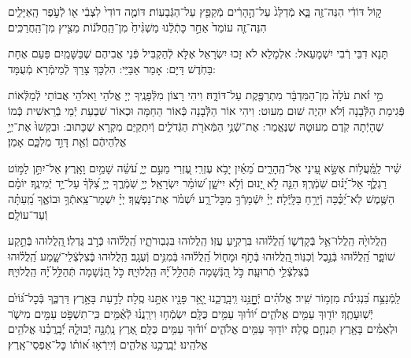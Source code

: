 \documentclass[twoside, openany, parskip=half, 11pt]{book}
\begin{document}
ק֣וֹל דּוֹדִ֔י הִנֵּה־זֶ֖ה בָּ֑א מְֿדַלֵּג֙ עַל־הֶ֣הָרִ֔ים מְֿקַפֵּ֖ץ עַל־הַגְּֿבָעֽוֹת׃ דּוֹמֶ֤ה דוֹדִי֙ לִצְבִ֔י א֖וֹ לְֿעֹ֣פֶר הָֽאַיָּלִ֑ים הִנֵּה־זֶ֤ה עוֹמֵד֙ אַחַ֣ר כָּתְֿלֵ֔נוּ מַשְׁגִּ֨יחַ֙ מִן־הַֽחֲלֹּנ֔וֹת מֵצִ֖יץ מִן־הַֽחֲרַכִּֽים׃

תָּנָא דִבֵּי רְֿבִי יִשְׁמָעֵאל: אִלְמָלֵא לֹא זָכוּ יִשְׂרָאֵל אֶלָּא לְֿהַקְבִּיל פְּֿנֵי אֲבִיהֶם שֶׁבַּשָּׁמַֽיִם פַּעַם אֶחָת בַּחֹֽדֶשׁ דַּיָּם: אָמַר אַבַּיֵּי: הִלְכָּךְ צָרֵךְ לְֿמֵימְֿרָא מְֿעֻמָּד:

מִ֣י זֹ֗את עֹלָה֙ מִן־הַמִּדְבָּ֔ר מִתְרַפֶּ֖קֶת עַל־דּוֹדָ֑הּ׃
וִיהִי רָצוֹן מִלְּֿפָנֶֽיךָ יְיָ אֱלֹהַי וֵאלֹהֵי אֲבוֹתַי לְֿמַלְּֿאוֹת פְּֿגִימַת הַלְּֿבָנָה וְֿלֹא יִהְיֶה שׁוּם מִעוּט: וִיהִי אוֹר הַלְּֿבָנָה כְּֿאוֹר הַחַמָּה וּכְאוֹר שִׁבְעַת יְֿמֵי בְֿרֵאשִׁית כְּֿמוֹ שֶׁהָיְֿתָה קֹֽדֶם מִעוּטָהּ שֶׁנֶּאֱמַר:
אֶת־שְֿׁנֵ֥י הַמְּֿאֹרֹ֖ת הַגְּֿדֹלִ֑ים וְֿיִתְקַיַּם מִקְרָא שֶׁכָּתוּב: וּבִקְשׁוּ֙ אֶת־יְיָ֣ אֱלֹֽהֵיהֶ֔ם וְֿאֵ֖ת דָּוִ֣ד מַלְכָּ֑ם אָמֵן׃


שִׁ֗יר לַֽמַּֽ֫עֲל֥וֹת אֶשָּׂ֣א עֵ֭ינַי אֶל־הֶֽהָרִ֑ים מֵ֝אַ֗יִן יָבֹ֥א עֶזְרִֽי׃ עֶ֭זְרִי מֵעִ֣ם יְיָ֑ עֹ֝שֵׂ֗ה שָׁמַ֥יִם וָאָֽרֶץ׃ אַל־יִתֵּ֣ן לַמּ֣וֹט רַגְלֶ֑ךָ אַל־יָ֝נ֗וּם שֹֽׁמְֿרֶֽךָ׃ הִנֵּ֤ה לֹ֣א יָ֭נוּם וְֿלֹ֣א יִישָׁ֑ן שׁ֝וֹמֵ֗ר יִשְׂרָאֵֽל׃ יְיָ֥ שֹֽׁמְֿרֶ֑ךָ יְיָ֥ צִ֝לְּֿךָ֗ עַל־יַ֥ד יְֿמִינֶֽךָ׃ יוֹמָ֗ם הַשֶּׁ֥מֶשׁ לֹֽא־יַ֝כֶּ֗כָּה וְֿיָרֵ֥חַ בַּלָּֽיְֿלָה׃ יְיָ֗ יִשְֿׁמָרְֿךָ֥ מִכׇּל־רָ֑ע יִ֝שְׁמֹ֗ר אֶת־נַפְשֶֽׁךָ׃ יְיָ֗ יִשְׁמָר־צֵֽאתְֿךָ֥ וּבוֹאֶ֑ךָ מֵֽ֝עַתָּ֗ה וְֿעַד־עוֹלָֽם׃

הַֽלֲלוּיָ֙הּ הַֽלֲלוּ־אֵ֥ל בְּֿקָדְֿשׁ֑וֹ הַֽ֝לֲל֗וּהוּ בִּרְקִ֥יעַ עֻזּֽוֹ׃
הַֽלֲלוּהוּ בִּגְבֽוּרֹתָ֑יו הַֽ֝לֲל֗וּהוּ כְּֿרֹ֣ב גֻּדְלֽוֹ׃
֖הַֽלֲלוּהוּ בְּֿתֵ֣קַע שׁוֹפָ֑ר הַֽ֝לֲל֗וּהוּ בְּֿנֵ֣בֶל וְֿכִנּֽוֹר׃
֖הַֽלֲלוּהוּ בְּֿתֹ֣ף וּמָח֑וֹל הַֽ֝לֲל֗וּהוּ בְּֿמִנִּ֥ים וְֿעֻגָֽב׃
הַֽלֲלוּהוּ בְּֽֿצִלְצְֿלֵי־שָׁ֑מַע הַֽ֝לֲל֗וּהוּ בְּֽֿצִלְצְֿלֵ֥י תְֿרוּעָֽה׃
כֹּ֣ל הַ֭נְּֿשָׁמָה תְּֿהַלֵּ֥ל ֝יָ֗הּ הַֽלֲלוּיָֽהּ׃
כֹּ֣ל הַ֭נְּֿשָׁמָה תְּֿהַלֵּ֥ל ֝יָ֗הּ הַֽלֲלוּיָֽהּ׃

\enlargethispage{\baselineskip}
לַֽמְֿנַצֵּ֥ח
בִּ֝נְגִינֹ֗ת מִזְמ֥וֹר שִֽׁיר׃ אֱלֹהִ֗ים יְֿחׇׇׇׇׇׇׇׇָנֵּ֥נוּ וִֽיבָֽרֲכֵ֑נוּ יָ֤אֵ֥ר פָּנָ֖יו אִתָּ֣נוּ סֶֽלָה׃ לָדַ֣עַת בָּאָ֣רֶץ דַּרְכֶּ֑ךָ בְּֿכׇל־גּ֝וֹיִ֗ם יְֿשֽׁוּעָתֶֽךָ׃ יוֹד֖וּךָ עַמִּ֥ים אֱלֹהִ֑ים י֝וֹד֗וּךָ עַמִּ֥ים כֻּלָּֽם׃ יִשְׂמְֿח֥וּ וִירַֽנֲנ֗וּ לְֿאֻ֫מִּ֥ים כִּֽי־תִשְׁפֹּ֣ט עַמִּ֣ים מִישֹׁ֑ר וּלְאֻמִּ֓ים בָּאָ֖רֶץ תַּנְחֵ֣ם סֶֽלָה׃ יוֹד֖וּךָ עַמִּ֥ים אֱלֹהִ֑ים י֝וֹד֗וּךָ עַמִּ֥ים כֻּלָּֽם׃ אֶ֭רֶץ נָֽתְֿנָ֣ה יְֿבוּלָ֑הּ יְֿ֝בָֽרֲכֵ֗נוּ אֱלֹהִ֥ים אֱלֹהֵֽינוּ׃ יְֿבָֽרֲכֵ֥נוּ אֱלֹהִ֑ים וְֿיִֽירְֿא֥וּ א֝וֹת֗וֹ כׇּל־אַפְסֵי־אָֽרֶץ׃
\end{document}
